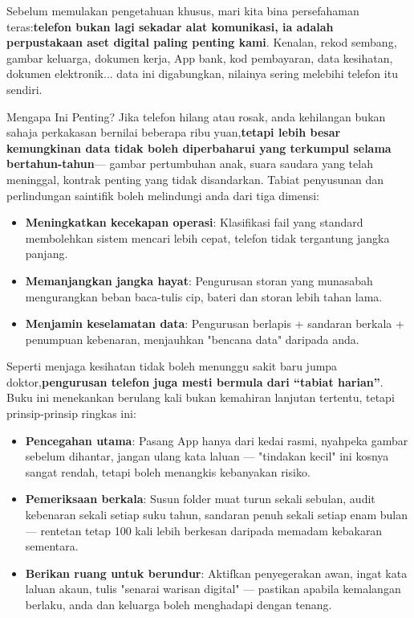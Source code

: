 Sebelum memulakan pengetahuan khusus, mari kita bina persefahaman teras:\textbf{telefon bukan lagi sekadar alat komunikasi, ia adalah perpustakaan aset digital paling penting kami}. Kenalan, rekod sembang, gambar keluarga, dokumen kerja, App bank, kod pembayaran, data kesihatan, dokumen elektronik... data ini digabungkan, nilainya sering melebihi telefon itu sendiri.

\begin{tcbinfo}{Mengapa Ini Penting?}
Jika telefon hilang atau rosak, anda kehilangan bukan sahaja perkakasan bernilai beberapa ribu yuan,\textbf{tetapi lebih besar kemungkinan data tidak boleh diperbaharui yang terkumpul selama bertahun-tahun}— gambar pertumbuhan anak, suara saudara yang telah meninggal, kontrak penting yang tidak disandarkan. Tabiat penyusunan dan perlindungan saintifik boleh melindungi anda dari tiga dimensi:

\begin{itemize}
  \item \textbf{Meningkatkan kecekapan operasi}: Klasifikasi fail yang standard membolehkan sistem mencari lebih cepat, telefon tidak tergantung jangka panjang.
  \item \textbf{Memanjangkan jangka hayat}: Pengurusan storan yang munasabah mengurangkan beban baca-tulis cip, bateri dan storan lebih tahan lama.
  \item \textbf{Menjamin keselamatan data}: Pengurusan berlapis + sandaran berkala + penumpuan kebenaran, menjauhkan "bencana data" daripada anda.
\end{itemize}

\end{tcbinfo}


Seperti menjaga kesihatan tidak boleh menunggu sakit baru jumpa doktor,\textbf{pengurusan telefon juga mesti bermula dari “tabiat harian”}. Buku ini menekankan berulang kali bukan kemahiran lanjutan tertentu, tetapi prinsip-prinsip ringkas ini:

\begin{itemize}
  \item \textbf{Pencegahan utama}: Pasang App hanya dari kedai rasmi, nyahpeka gambar sebelum dihantar, jangan ulang kata laluan — "tindakan kecil" ini kosnya sangat rendah, tetapi boleh menangkis kebanyakan risiko.
  \item \textbf{Pemeriksaan berkala}: Susun folder muat turun sekali sebulan, audit kebenaran sekali setiap suku tahun, sandaran penuh sekali setiap enam bulan — rentetan tetap 100 kali lebih berkesan daripada memadam kebakaran sementara.
  \item \textbf{Berikan ruang untuk berundur}: Aktifkan penyegerakan awan, ingat kata laluan akaun, tulis "senarai warisan digital" — pastikan apabila kemalangan berlaku, anda dan keluarga boleh menghadapi dengan tenang.
\end{itemize}
